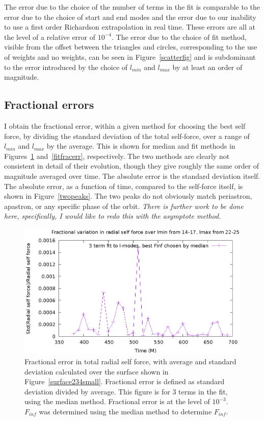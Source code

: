 The error due to the choice of the number of terms in the fit is comparable to the error due to the choice of start and end modes and the error due to our inability to use a first order Richardson extrapolation in real time. These errors are all at the level of a relative error of $10^{-4}$. The error due to the choice of fit method, visible from the offset between the triangles and circles, corresponding to the use of weights and no weights, can be seen in Figure~\ref{scatterfig} and is subdominant to the error introduced by the choice of $l_{min}$ and $l_{max}$ by at least an order of magnitude. 




\subsection{Fractional errors}


I obtain the fractional error, within a given method for choosing the best self force, by dividing the standard deviation of the total self-force, over a range of $l_{min}$ and $l_{max}$ by the average. This is shown for median and fit methods in Figures~\ref{medfracerr} and~\ref{fitfracerr}, respectively. The two methods are clearly not consistent in detail of their evolution, though they give roughly the same order of magnitude averaged over time. The absolute error is the standard deviation itself. The absolute error, as a function of time, compared to the self-force itself, is shown in Figure~\ref{twopeaks}. The two peaks do not obviously match periastron, apastron, or any specific phase of the orbit. {\em There is further work to be done here, specifically, I would like to redo this with the asymptote method.}


\begin{figure}
  \includegraphics{fractionalErrorSelfForceOverTime3termMedian}
  \caption{Fractional error in total radial self force, with average and standard deviation calculated over the surface shown in Figure~\ref{surface234small}. Fractional error is defined as standard deviation divided by average. This figure is for 3 terms in the fit, using the median method. Fractional error is at the level of $10^{-3}$. $F_{inf}$ was determined using the median method to determine $F_{inf}$.}
  \label{medfracerr}
\end{figure}

